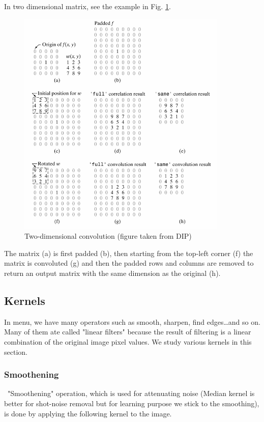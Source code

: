 In two dimensional matrix, see the example in Fig. \ref{fig:img52}. 

\begin{figure}[htbp]
\begin{center}
\includegraphics[width=10cm]{img/CMCIBasicCourse201102-img52.png}
\caption{ Two-dimensional convolution (figure taken from DIP)}
\label{fig:img52}
\end{center}
\end{figure}

The matrix (a) is first padded (b), then starting from the top-left
corner (f) the matrix is convoluted (g) and then the padded rows and
columns are removed to return an output matrix with the same dimension
as the original (h).

\subsection{Kernels}

In \ijmenu{[Process]} menu, we have many operators such
as smooth, sharpen, find edges\dots and so on. Many of them ate
called "linear filters" because
the result of filtering is a linear combination of the original image
pixel values. We study various kernels in this section. 

\subsubsection{Smoothening}
\ "Smoothening" operation, which is
used for attenuating noise (Median kernel is better for shot-noise
removal but for learning purpose we stick to the smoothing), is done by
applying the following kernel to the image. 

